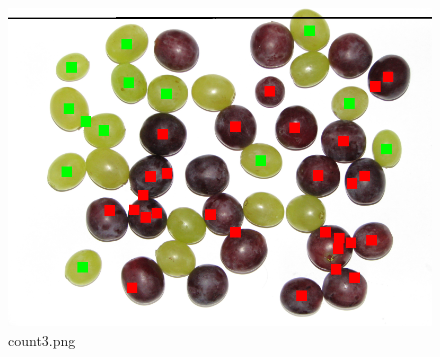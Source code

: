 \documentclass{classrep}
\begin{document}
\begin{figure}
\begin{minipage}{0.3\linewidth}
    \includegraphics[width=\textwidth]{gfx/count3_overlayed.png}
    \caption{count3.png}
    \label{fig:c3}
  \end{minipage}
\end{figure}
\end{document}
